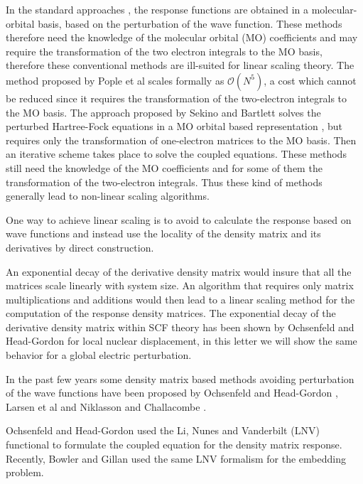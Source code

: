 \documentclass[twocolumn,showpacs,preprintnumbers,amsmath,amssymb]{revtex4}
\begin{document}
 In the standard approaches \cite{Pople_1979,Sekino_1986,Dupuis_1991},
 the response functions are
 obtained in a molecular-orbital basis, based on
 the perturbation of the wave function.
 These methods therefore need the knowledge
 of the molecular orbital (MO) coefficients and may require
 the transformation of the two electron
 integrals to the MO basis, therefore these conventional methods
 are ill-suited for linear scaling theory.
 The method proposed
 by Pople et al \cite{Pople_1979} scales formally 
 as $\mathcal{O}(N^5)$, a cost which cannot be
 reduced since it requires the transformation
 of the two-electron integrals to the MO basis.
 The approach proposed by Sekino and Bartlett 
 solves the perturbed Hartree-Fock equations in
 a MO orbital based representation \cite{Sekino_1986,Dupuis_1991},
 but requires only the transformation of one-electron matrices
 to the MO basis. Then an iterative scheme takes place
 to solve the coupled equations. These methods still need
 the knowledge of the MO coefficients and for some of them
 the transformation of the two-electron integrals.
 Thus these kind of methods generally lead to 
 non-linear scaling algorithms.

 One way to achieve linear scaling is to avoid to calculate 
 the response based on wave functions and instead use the
 locality of the density matrix and its derivatives 
 by direct construction.


 An exponential decay of the derivative density matrix
 would insure that all the matrices scale linearly with system size.
 An algorithm that requires only matrix multiplications and 
 additions would then lead to a linear scaling method
 for the computation of the response density matrices.
 The exponential decay of the derivative density matrix within SCF theory
 has been shown by Ochsenfeld and Head-Gordon \cite{Ochsenfeld_1997}
 for local nuclear displacement, in this letter we will show the same 
 behavior for a global electric perturbation.

 In the past few years some density matrix based methods
 avoiding perturbation of the wave functions 
 have been proposed by Ochsenfeld and Head-Gordon
 \cite{Ochsenfeld_1997}, Larsen et al \cite{Helgaker_2001}
 and Niklasson and Challacombe \cite{Anders}.

 Ochsenfeld and Head-Gordon used the Li, Nunes and Vanderbilt (LNV)
 functional \cite{LNV} to formulate the coupled equation for the 
 density matrix response. Recently, Bowler and Gillan 
 \cite{Bowler_2002} used the same LNV formalism for
 the embedding problem.
\end{document}
